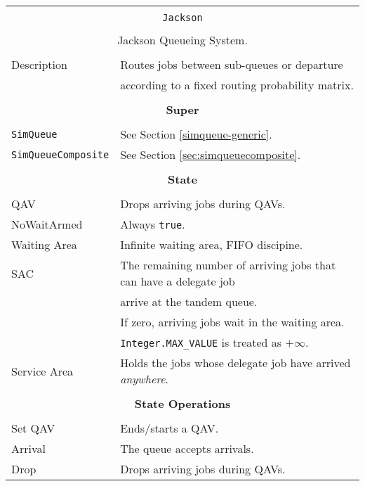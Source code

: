 \begin{tabular}{|l|l|}
	\hline
	\multicolumn{2}{|c|}{} \\
	\multicolumn{2}{|c|}{\lstinline[basicstyle=\large]{Jackson}} \\
	\multicolumn{2}{|c|}{} \\
	\multicolumn{2}{|c|}{Jackson Queueing System.} \\
	\multicolumn{2}{|c|}{} \\
	\hline
	Description & Routes jobs between sub-queues or departure \\
	            & according to a fixed routing probability matrix. \\
	\hline
	\multicolumn{2}{|c|}{} \\
	\multicolumn{2}{|c|}{\bf Super} \\
	\multicolumn{2}{|c|}{} \\
	\hline
	\lstinline|SimQueue| & See Section \ref{simqueue-generic}. \\
	\lstinline|SimQueueComposite| & See Section \ref{sec:simqueuecomposite}. \\
	\hline
	\multicolumn{2}{|c|}{} \\
	\multicolumn{2}{|c|}{\bf State} \\
	\multicolumn{2}{|c|}{} \\
	\hline
	QAV & Drops arriving jobs during QAVs. \\
	\hline
	NoWaitArmed & Always \lstinline|true|. \\
	\hline
	Waiting Area & Infinite waiting area, FIFO discipine. \\
	\hline
	SAC & The remaining number of arriving jobs that can have a delegate job \\
	& arrive at the tandem queue. \\
	& If zero, arriving jobs wait in the waiting area. \\
	& \lstinline|Integer.MAX_VALUE| is treated as $+\infty$. \\
	\hline
	Service Area & Holds the jobs whose delegate job have arrived {\em anywhere}. \\
	\hline
	\multicolumn{2}{|c|}{} \\
	\multicolumn{2}{|c|}{\bf State Operations} \\
	\multicolumn{2}{|c|}{} \\
	\hline
	Set QAV & Ends/starts a QAV. \\
	\hline
	Arrival & The queue accepts arrivals. \\
	\hline
	Drop & Drops arriving jobs during QAVs. \\

\end{tabular}
